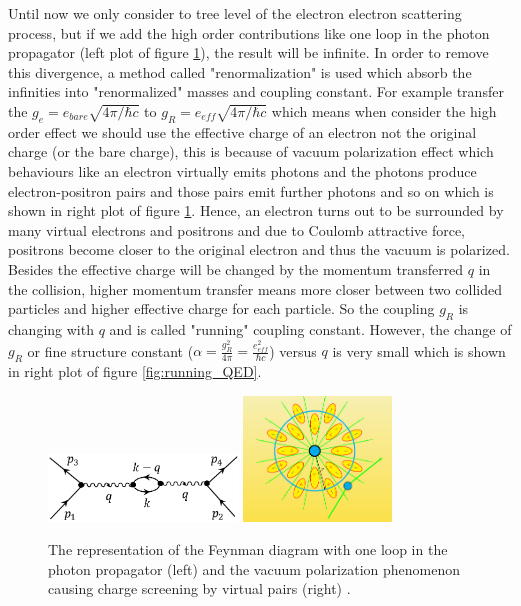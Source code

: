 Until now we only consider to tree level of the electron electron scattering process, but if we add the high order contributions like one loop in the photon propagator (left plot of figure \ref{fig:screened_QED}), the result will be infinite. In order to remove this divergence, a method called "renormalization" is used which absorb the infinities into "renormalized" masses and coupling constant. For example transfer the $g_{e}=e_{bare}\sqrt{4\pi/\hbar c}$ to $g_{R}=e_{eff}\sqrt{4\pi/\hbar c}$ which means when consider the high order effect we should use the effective charge of an electron not the original charge (or the bare charge), this is because of vacuum polarization effect which behaviours like an electron virtually emits photons and the photons produce electron-positron pairs and those pairs emit further photons and so on which is shown in right plot of figure \ref{fig:screened_QED}. Hence, an electron turns out to be surrounded by many virtual electrons and positrons and due to Coulomb attractive force, positrons become closer to the original electron and thus the vacuum is polarized. Besides the effective charge will be changed by the momentum transferred $q$ in the collision, higher momentum transfer means more closer between two collided particles and higher effective charge for each particle. So the coupling $g_{R}$ is changing with $q$ and is called "running" coupling constant. However, the change of $g_{R}$ or fine structure constant ($\alpha=\frac{g_{R}^{2}}{4\pi}=\frac{e_{eff}^{2}}{\hbar c}$) versus $q$ is very small which is shown in right plot of figure \ref{fig:running_QED}.
\begin{figure}[h!]
 \begin{center}
\includegraphics[width=0.45\textwidth]{figures/theory/QED_loop.png}
\includegraphics[width=0.35\textwidth]{figures/theory/screened.png}
\caption{The representation of the Feynman diagram with one loop in the photon propagator (left) and the vacuum polarization phenomenon causing charge screening by virtual pairs (right) \cite{screened}.}
  \label{fig:screened_QED}
 \end{center}
\end{figure}

